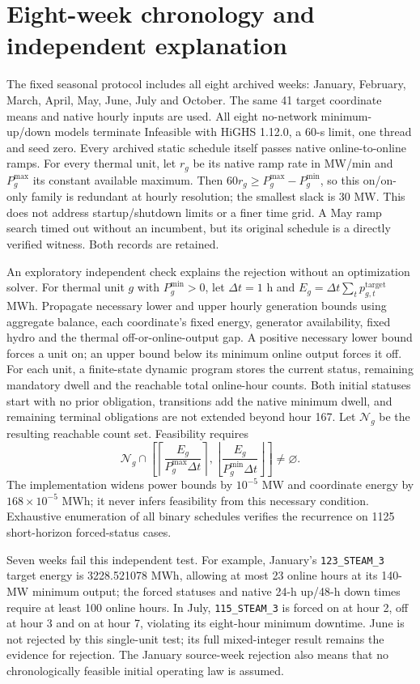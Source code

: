 \documentclass[10pt,journal,onecolumn]{IEEEtran}
\begin{document}
\section{Eight-week chronology and independent explanation}
The fixed seasonal protocol includes all eight archived weeks: January, February, March, April, May, June, July and October. The same 41 target coordinate means and native hourly inputs are used. All eight no-network minimum-up/down models terminate Infeasible with HiGHS 1.12.0, a 60-s limit, one thread and seed zero. Every archived static schedule itself passes native online-to-online ramps. For every thermal unit, let $r_g$ be its native ramp rate in MW/min and $P_g^{\max}$ its constant available maximum. Then $60r_g\ge P_g^{\max}-P_g^{\min}$, so this on/on-only family is redundant at hourly resolution; the smallest slack is 30 MW. This does not address startup/shutdown limits or a finer time grid. A May ramp search timed out without an incumbent, but its original schedule is a directly verified witness. Both records are retained.

An exploratory independent check explains the rejection without an optimization solver. For thermal unit $g$ with $P_g^{\min}>0$, let $\Delta t=1$ h and $E_g=\Delta t\sum_t p^{\mathrm{target}}_{g,t}$ MWh. Propagate necessary lower and upper hourly generation bounds using aggregate balance, each coordinate's fixed energy, generator availability, fixed hydro and the thermal off-or-online-output gap. A positive necessary lower bound forces a unit on; an upper bound below its minimum online output forces it off. For each unit, a finite-state dynamic program stores the current status, remaining mandatory dwell and the reachable total online-hour counts. Both initial statuses start with no prior obligation, transitions add the native minimum dwell, and remaining terminal obligations are not extended beyond hour 167. Let $\mathcal N_g$ be the resulting reachable count set. Feasibility requires
\[
\mathcal N_g\cap\left[\left\lceil\frac{E_g}{P_g^{\max}\Delta t}\right\rceil,
\left\lfloor\frac{E_g}{P_g^{\min}\Delta t}\right\rfloor\right]\ne\varnothing.
\]
The implementation widens power bounds by $10^{-5}$ MW and coordinate energy by $168\times10^{-5}$ MWh; it never infers feasibility from this necessary condition. Exhaustive enumeration of all binary schedules verifies the recurrence on 1125 short-horizon forced-status cases.

Seven weeks fail this independent test. For example, January's \texttt{123\_STEAM\_3} target energy is 3228.521078 MWh, allowing at most 23 online hours at its 140-MW minimum output; the forced statuses and native 24-h up/48-h down times require at least 100 online hours. In July, \texttt{115\_STEAM\_3} is forced on at hour 2, off at hour 3 and on at hour 7, violating its eight-hour minimum downtime. June is not rejected by this single-unit test; its full mixed-integer result remains the evidence for rejection. The January source-week rejection also means that no chronologically feasible initial operating law is assumed.
\end{document}
